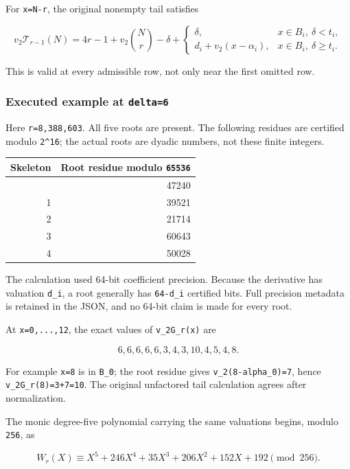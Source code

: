 \documentclass[11pt,letterpaper]{article}
\begin{document}
For \texttt{x=N-r}, the original nonempty tail satisfies

\[
\boxed{v_2\mathcal T_{r-1}(N)
=4r-1+v_2\binom Nr-\delta+
\begin{cases}
\delta,&x\in B_i,\ \delta<t_i,\\
d_i+v_2(x-\alpha_i),&x\in B_i,\ \delta\ge t_i.
\end{cases}} \tag{6.1}
\]

This is valid at every admissible row, not only near the first omitted row.

\subsubsection{\texorpdfstring{Executed example at \texttt{delta=6}}{Executed example at delta=6}}\label{executed-example-at-delta6}

Here \texttt{r=8,388,603}. All five roots are present. The following residues are certified modulo \texttt{2\^{}16}; the actual roots are dyadic numbers, not these finite integers.

\begin{longtable}[]{@{}rr@{}}
\toprule\noalign{}
Skeleton & Root residue modulo \texttt{65536} \\
\midrule\noalign{}
\endhead
\bottomrule\noalign{}
\endlastfoot
0 & 47240 \\
1 & 39521 \\
2 & 21714 \\
3 & 60643 \\
4 & 50028 \\
\end{longtable}

The calculation used 64-bit coefficient precision. Because the derivative has valuation \texttt{d\_i}, a root generally has \texttt{64-d\_i} certified bits. Full precision metadata is retained in the JSON, and no 64-bit claim is made for every root.

At \texttt{x=0,...,12}, the exact values of \texttt{v\_2G\_r(x)} are

\[
6,6,6,6,6,3,4,3,10,4,5,4,8.
\]

For example \texttt{x=8} is in \texttt{B\_0}; the root residue gives \texttt{v\_2(8-alpha\_0)=7}, hence \texttt{v\_2G\_r(8)=3+7=10}. The original unfactored tail calculation agrees after normalization.

The monic degree-five polynomial carrying the same valuations begins, modulo \texttt{256}, as

\[
W_r(X)\equiv X^5+246X^4+35X^3+206X^2+152X+192\pmod{256}.
\]
\end{document}

